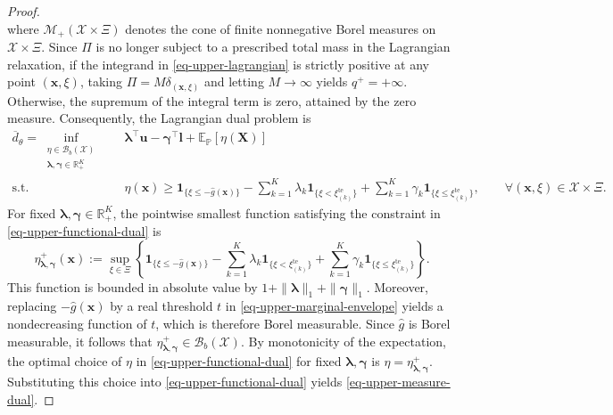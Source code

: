 \documentclass[review,11pt,3p,authoryear,nopreprintline]{elsarticle}
\begin{document}
\begin{proof}
\begin{equation}
    \label{eq-upper-dual-function}
  \end{equation}
  where $\mathcal M_+(\mathcal X\times\Xi)$ denotes the cone of finite nonnegative Borel measures on $\mathcal X\times\Xi$. Since $\Pi$ is no longer subject to a prescribed total mass in the Lagrangian relaxation, if the integrand in \eqref{eq-upper-lagrangian} is strictly positive at any point $(\bm x,\xi)$, taking $\Pi=M\delta_{(\bm x,\xi)}$ and letting $M\to\infty$ yields $q^+=+\infty$. Otherwise, the supremum of the integral term is zero, attained by the zero measure. Consequently, the Lagrangian dual problem is
  \begin{equation}
    \begin{aligned}
      \overline d_\theta
      =\inf_{\substack{\eta\in\mathcal B_b(\mathcal X)\\
      \bm\lambda,\bm\gamma\in\mathbb R_+^K}}
      \quad &\bm\lambda^\top\bm u-\bm\gamma^\top\bm l+\mathbb E_{\mathbb P}\left[\eta(\bm X)\right]\\
      \text{s.t.}\quad & \eta(\bm x)\ge
      \mathbf1_{\{\xi\le-\hat g(\bm x)\}}
      -\sum_{k=1}^K\lambda_k\mathbf1_{\{\xi<\xi_{(k)}^{\mathrm{te}}\}} 
      +\sum_{k=1}^K\gamma_k\mathbf1_{\{\xi\le\xi_{(k)}^{\mathrm{te}}\}},
      \qquad\forall(\bm x,\xi)\in\mathcal X\times\Xi.
    \end{aligned}
    \label{eq-upper-functional-dual}
  \end{equation}
  For fixed $\bm\lambda,\bm\gamma\in\mathbb R_+^K$, the pointwise smallest function satisfying the constraint in \eqref{eq-upper-functional-dual} is
  \begin{equation}
    \eta^+_{\bm\lambda,\bm\gamma}(\bm x)
    :=\sup_{\xi\in\Xi}\left\{
      \mathbf1_{\{\xi\le-\hat g(\bm x)\}}
      -\sum_{k=1}^K\lambda_k\mathbf1_{\{\xi<\xi_{(k)}^{\mathrm{te}}\}}
      +\sum_{k=1}^K\gamma_k\mathbf1_{\{\xi\le\xi_{(k)}^{\mathrm{te}}\}}
    \right\}.
    \label{eq-upper-marginal-envelope}
  \end{equation}
  This function is bounded in absolute value by $1+\|\bm\lambda\|_1+\|\bm\gamma\|_1$. Moreover, replacing $-\hat g(\bm x)$ by a real threshold $t$ in \eqref{eq-upper-marginal-envelope} yields a nondecreasing function of $t$, which is therefore Borel measurable. Since $\hat g$ is Borel measurable, it follows that $\eta^+_{\bm\lambda,\bm\gamma}\in\mathcal B_b(\mathcal X)$. By monotonicity of the expectation, the optimal choice of $\eta$ in \eqref{eq-upper-functional-dual} for fixed $\bm\lambda,\bm\gamma$ is $\eta=\eta^+_{\bm\lambda,\bm\gamma}$. Substituting this choice into \eqref{eq-upper-functional-dual} yields \eqref{eq-upper-measure-dual}.


\end{proof}
\end{document}
